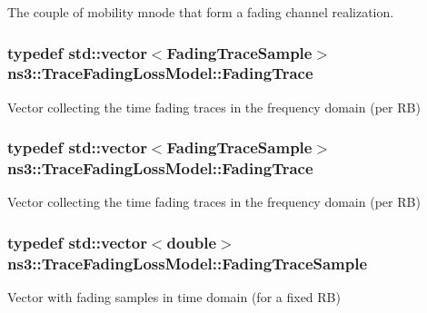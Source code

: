 The couple of mobility mnode that form a fading channel realization. 

\subsubsection[{\texorpdfstring{Fading\+Trace}{FadingTrace}}]{\setlength{\rightskip}{0pt plus 5cm}typedef std\+::vector$<${\bf Fading\+Trace\+Sample}$>$ {\bf ns3\+::\+Trace\+Fading\+Loss\+Model\+::\+Fading\+Trace}\hspace{0.3cm}{\ttfamily [private]}}\hypertarget{classns3_1_1TraceFadingLossModel_a909ee0cf2f74bc9914ac283e0ff2eb15}{}\label{classns3_1_1TraceFadingLossModel_a909ee0cf2f74bc9914ac283e0ff2eb15}
Vector collecting the time fading traces in the frequency domain (per RB) 
\subsubsection[{\texorpdfstring{Fading\+Trace}{FadingTrace}}]{\setlength{\rightskip}{0pt plus 5cm}typedef std\+::vector$<${\bf Fading\+Trace\+Sample}$>$ {\bf ns3\+::\+Trace\+Fading\+Loss\+Model\+::\+Fading\+Trace}\hspace{0.3cm}{\ttfamily [private]}}\hypertarget{classns3_1_1TraceFadingLossModel_a909ee0cf2f74bc9914ac283e0ff2eb15}{}\label{classns3_1_1TraceFadingLossModel_a909ee0cf2f74bc9914ac283e0ff2eb15}
Vector collecting the time fading traces in the frequency domain (per RB) 
\subsubsection[{\texorpdfstring{Fading\+Trace\+Sample}{FadingTraceSample}}]{\setlength{\rightskip}{0pt plus 5cm}typedef std\+::vector$<$double$>$ {\bf ns3\+::\+Trace\+Fading\+Loss\+Model\+::\+Fading\+Trace\+Sample}\hspace{0.3cm}{\ttfamily [private]}}\hypertarget{classns3_1_1TraceFadingLossModel_a7bedaeca55a257cd42f07e348cdec2eb}{}\label{classns3_1_1TraceFadingLossModel_a7bedaeca55a257cd42f07e348cdec2eb}
Vector with fading samples in time domain (for a fixed RB) 
